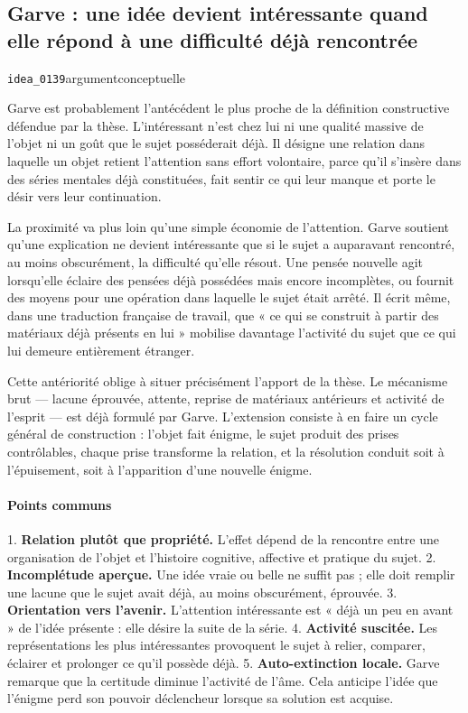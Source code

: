 \documentclass[10pt,a4paper]{article}
\begin{document}
\subsection{Garve : une idée devient intéressante quand elle répond à une difficulté déjà rencontrée}
{\small\color{metadata} \texttt{idea\_0139}\quad\textbullet\quad argument\quad\textbullet\quad conceptuelle\par}

Garve est probablement l'antécédent le plus proche de la définition constructive défendue par la thèse. L'intéressant n'est chez lui ni une qualité massive de l'objet ni un goût que le sujet posséderait déjà. Il désigne une relation dans laquelle un objet retient l'attention sans effort volontaire, parce qu'il s'insère dans des séries mentales déjà constituées, fait sentir ce qui leur manque et porte le désir vers leur continuation.

La proximité va plus loin qu'une simple économie de l'attention. Garve soutient qu'une explication ne devient intéressante que si le sujet a auparavant rencontré, au moins obscurément, la difficulté qu'elle résout. Une pensée nouvelle agit lorsqu'elle éclaire des pensées déjà possédées mais encore incomplètes, ou fournit des moyens pour une opération dans laquelle le sujet était arrêté. Il écrit même, dans une traduction française de travail, que « ce qui se construit à partir des matériaux déjà présents en lui » mobilise davantage l'activité du sujet que ce qui lui demeure entièrement étranger.

Cette antériorité oblige à situer précisément l'apport de la thèse. Le mécanisme brut — lacune éprouvée, attente, reprise de matériaux antérieurs et activité de l'esprit — est déjà formulé par Garve. L'extension consiste à en faire un cycle général de construction : l'objet fait énigme, le sujet produit des prises contrôlables, chaque prise transforme la relation, et la résolution conduit soit à l'épuisement, soit à l'apparition d'une nouvelle énigme.

\paragraph{Points communs}
1. \textbf{Relation plutôt que propriété.} L'effet dépend de la rencontre entre une    organisation de l'objet et l'histoire cognitive, affective et pratique du    sujet. 2. \textbf{Incomplétude aperçue.} Une idée vraie ou belle ne suffit pas ; elle doit    remplir une lacune que le sujet avait déjà, au moins obscurément, éprouvée. 3. \textbf{Orientation vers l'avenir.} L'attention intéressante est « déjà un peu en    avant » de l'idée présente : elle désire la suite de la série. 4. \textbf{Activité suscitée.} Les représentations les plus intéressantes provoquent le    sujet à relier, comparer, éclairer et prolonger ce qu'il possède déjà. 5. \textbf{Auto-extinction locale.} Garve remarque que la certitude diminue l'activité    de l'âme. Cela anticipe l'idée que l'énigme perd son pouvoir déclencheur lorsque    sa solution est acquise.
\end{document}
